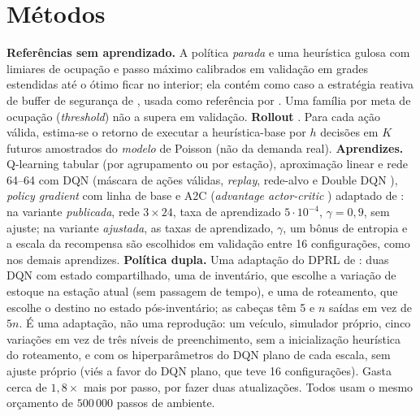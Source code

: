 \documentclass[12pt,a4paper]{article}
\begin{document}
\section{M\'etodos}
\textbf{Refer\^encias sem aprendizado.} A pol\'itica \emph{parada} e uma heur\'istica gulosa com limiares de ocupa\c{c}\~ao e passo m\'aximo calibrados em
valida\c{c}\~ao em grades estendidas at\'e o \'otimo ficar no interior; ela cont\'em como caso a estrat\'egia reativa de buffer de seguran\c{c}a de
\citet{brinkmann2015}, usada como refer\^encia por \citet{seo2022}. Uma fam\'ilia por meta de ocupa\c{c}\~ao (\emph{threshold}) n\~ao a supera em valida\c{c}\~ao.
\textbf{Rollout} \citep{bertsekas1997}. Para cada a\c{c}\~ao v\'alida, estima-se o retorno de executar a heur\'istica-base por $h$ decis\~oes em $K$ futuros amostrados do
\emph{modelo} de Poisson (n\~ao da demanda real). \textbf{Aprendizes.} Q-learning tabular (por agrupamento ou por esta\c{c}\~ao), aproxima\c{c}\~ao linear e
rede 64--64 com DQN \citep{mnih2015} (m\'ascara de a\c{c}\~oes v\'alidas, \emph{replay}, rede-alvo e Double DQN \citep{vanhasselt2016}), \emph{policy gradient} com linha de base e
A2C (\emph{advantage actor-critic} \citep{mnih2016}) adaptado de \citet{seo2022}: na variante \emph{publicada}, rede $3\times 24$, taxa de aprendizado $5\cdot 10^{-4}$, $\gamma = 0{,}9$, sem ajuste; na variante \emph{ajustada}, as taxas de aprendizado, $\gamma$, um bônus de entropia e a escala da recompensa s\~ao escolhidos em valida\c{c}\~ao entre 16 configura\c{c}\~oes, como nos demais aprendizes. \textbf{Pol\'itica dupla.} Uma adapta\c{c}\~ao do DPRL de \citet{liang2024}: duas DQN com estado compartilhado, uma de invent\'ario, que escolhe a varia\c{c}\~ao de estoque
na esta\c{c}\~ao atual (sem passagem de tempo), e uma de roteamento, que escolhe o destino no estado p\'os-invent\'ario; as cabe\c{c}as t\^em 5 e $n$ sa\'idas em vez de $5n$.
\'E uma adapta\c{c}\~ao, n\~ao uma reprodu\c{c}\~ao: um ve\'iculo, simulador pr\'oprio, cinco varia\c{c}\~oes em vez de tr\^es n\'iveis de preenchimento, sem a inicializa\c{c}\~ao
heur\'istica do roteamento, e com os hiperpar\^ametros do DQN plano de cada escala, sem ajuste pr\'oprio (vi\'es a favor do DQN plano, que teve 16 configura\c{c}\~oes). Gasta
cerca de $1{,}8\times$ mais por passo, por fazer duas atualiza\c{c}\~oes. Todos usam o mesmo
or\c{c}amento de $500\,000$ passos de ambiente.
\end{document}
